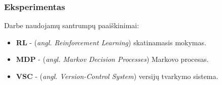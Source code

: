 \documentclass{VUMIFPSbakalaurinis}
\begin{document}
\subsubsection{Eksperimentas}

\printbibliography[heading=bibintoc] 

Darbe naudojamų santrumpų paaiškinimai:
\begin{itemize}[label={}, leftmargin=*] %
	\item \textbf{RL} - (\textit{angl. Reinforcement Learning}) skatinamasis mokymas.
	\item \textbf{MDP} - (\textit{angl. Markov Decision Processes}) Markovo procesas.
	\item \textbf{VSC} - (\textit{angl. Version-Control System}) versijų tvarkymo sistema.
\end{itemize}

\appendix
\end{document}
